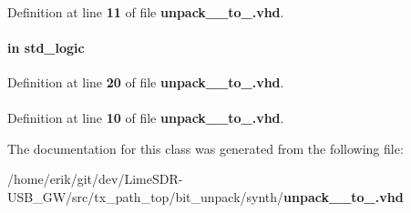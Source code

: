 \paragraph[{numeric\+\_\+std}]{\hspace{0.3cm}{\ttfamily [Package]}}\label{classunpack__64__to__64_a2edc34402b573437d5f25fa90ba4013e}


Definition at line {\bf 11} of file {\bf unpack\+\_\+\_\+to\+\_.\+vhd}.

\paragraph[{reset\+\_\+n}]{ {\bfseries \textcolor{keywordflow}{in}\textcolor{vhdlchar}{ }} {\bfseries \textcolor{comment}{std\+\_\+logic}\textcolor{vhdlchar}{ }} \hspace{0.3cm}{\ttfamily [Port]}}\label{classunpack__64__to__64_a446ea52ed8c4a84181a47d9165ce41a5}


Definition at line {\bf 20} of file {\bf unpack\+\_\+\_\+to\+\_.\+vhd}.

\paragraph[{std\+\_\+logic\+\_\+1164}]{\hspace{0.3cm}{\ttfamily [Package]}}\label{classunpack__64__to__64_acd03516902501cd1c7296a98e22c6fcb}


Definition at line {\bf 10} of file {\bf unpack\+\_\+\_\+to\+\_.\+vhd}.



The documentation for this class was generated from the following file\+:\begin{DoxyCompactItemize}
\item 
/home/erik/git/dev/\+Lime\+S\+D\+R-\/\+U\+S\+B\+\_\+\+G\+W/src/tx\+\_\+path\+\_\+top/bit\+\_\+unpack/synth/{\bf unpack\+\_\+\_\+to\+\_.\+vhd}\end{DoxyCompactItemize}
